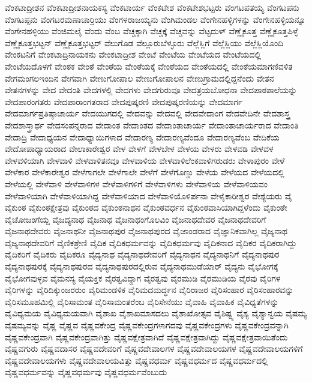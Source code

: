 {ವೆಂಕಟಾದ್ರೀಶನ
ವೆಂಕಟಾದ್ರೀಶನಾಯಕಸ್ಯ
ವೆಂಕಟಾರ್ಯ
ವೆಂಕಟೇಶ
ವೆಂಕಟೇಶಭಟ್ಟರು
ವೆಂಗಟಪತಯ್ಯ
ವೆಂಗಟಪನು
ವೆಂಗಟಪ್ಪನು
ವೆಂಗಟರಮಣಾಚಾರ್ರಿಯು
ವೆಂಗಳರಾಜಯ್ಯನು
ವೆಂಗಿಮಂಡಲ
ವೆಂಗೇನಹಳ್ಳಿಗಳನ್ನು
ವೆಂಗೇನಹಳ್ಳಿಯನ್ನೂ
ವೆಂಗೇನಹಳ್ಳಿಯು
ವೆಂಜಿಮಲೈ
ವೆಂದು
ವೆಂಬ
ವೆಚ್ಚಕ್ಕಾಗಿ
ವೆಚ್ಚಕ್ಕೆ
ವೆಚ್ಚವನ್ನು
ವೆಟ್ಟದುಳ್
ವೆಣ್ಣೈಕೂತ್ತ
ವೆಣ್ಣೈಕೂತ್ತಪಿಳ್ಳೆ
ವೆಣ್ಣೈಕೂತ್ತಭಟ್ಟನ್
ವೆಣ್ಣೈಕೂತ್ತಭಟ್ಟರ್
ವೆಲುಗೊಡ
ವೆಲ್ಲೂರುಬೆಳ್ಳೂರು
ವೆಲ್ಲೆಸ್ಲಿಗೆ
ವೆಲ್ಲೆಸ್ಲಿಯು
ವೆಲ್ಲೆಸ್ಲಿಯೊಂದಿ
ವೇಂಕಟನಿಗೆ
ವೇಂಕಟಾದ್ರಿನಾಯಕನು
ವೇಂಕಟಾದ್ರೀಶ
ವೇಂಟೆ
ವೇಂಟೆಯ
ವೇಂಟೆಯದ
ವೇಂಟೆಯದಲ್ಲಿ
ವೇಂಟೆಯದೊಳಗೆ
ವೇಂಠಕ
ವೇಂಠೆ
ವೇಂಠೆಯ
ವೇಂಠೆಯಕ್ಕೆ
ವೇಂಠೆಯದ
ವೇಂಠೆಯದಲ್ಲಿ
ವೇಂಠೆಯಮಾಗಣಿವಳಿತ
ವೇಗಮಂಗಲಇಂದಿನ
ವೇಗವಾಗಿ
ವೇಣುಗೋಪಾಲ
ವೇಣುಗೋಪಾಲನ
ವೇಣುಗ್ರಾಮದಲ್ಲಿದ್ದನೆಂದು
ವೇತನ
ವೇತನಗಳನ್ನು
ವೇದ
ವೇದಂತಿ
ವೇದಗಳಲ್ಲಿ
ವೇದಗಳು
ವೇದಗುರುವೂ
ವೇದತ್ರಯಬೋಧನಾ
ವೇದಪಾಠಶಾಲೆಯನ್ನು
ವೇದಪಾರಂಗತರು
ವೇದಪಾರಾಂಗತರಾದ
ವೇದಪುಷ್ಕರಣಿ
ವೇದಪುಷ್ಕರಣಿಯನ್ನು
ವೇದಮಾರ್ಗ
ವೇದಮಾರ್ಗಪ್ರತಿಷ್ಠಾಚಾರ್ಯ
ವೇದಯುಗದಲ್ಲಿ
ವೇದವನ್ನು
ವೇದವಲ್ಲಿ
ವೇದವೇದಾಂಗ
ವೇದವೇದಿನೇ
ವೇದಶಾಸ್ತ್ರ
ವೇದಶಾಸ್ತ್ರಾರ್ಥ
ವೇದಸಂಪನ್ನರಾದ
ವೇದಾಂತ
ವೇದಾಂತದ
ವೇದಾಂತಾಚಾರ್ಯ
ವೇದಾಂತಾಚಾರ್ಯರಾದ
ವೇದಾಂತಿ
ವೇದಾದ್ರಿ
ವೇದಾಧ್ಯಯನ
ವೇದಾಧ್ಯಾಯಿಗಳಾದ
ವೇದಾರಣ್ಯ
ವೇದಾರಣ್ಯವೆಂದೂ
ವೇದಾರಣ್ಯವೆಂಬ
ವೇದಿಕೆಯ
ವೇದೋಪಾಧ್ಯಾಯರಾದ
ವೇಲಾಕಾರೇಶ್ವರ
ವೇಳ
ವೇಳಗೆ
ವೇಳಬೇಳ
ವೇಳಯ
ವೇಳರು
ವೇಳವಡಿ
ವೇಳವಳ
ವೇಳವಳಿಯಾಗಿ
ವೇಳವಾಳಿ
ವೇಳವಾಳಿತನವೂ
ವೇಳವಾಳಿಯ
ವೇಳವಾಳಿಲೆಂಕವಾಳಿಗರುಡರು
ವೇಳಾಪುರಂ
ವೇಳೆ
ವೇಳೆಕಾರ
ವೇಳೆಕಾರೇಶ್ವರ
ವೇಳೆಗಾಗಲೇ
ವೇಳೆಗಾಲೇ
ವೇಳೆಗೆ
ವೇಳೆಗೊಣ್ಡು
ವೇಳೆಯ
ವೇಳೆಯದ
ವೇಳೆಯದಲ್ಲಿ
ವೇಳೆಯಲ್ಲಿ
ವೇಳೆವಾಳಿ
ವೇಳೆವಾಳಿಗಳ
ವೇಳೆವಾಳಿಗಳಿಗೆ
ವೇಳೆವಾಳಿಗಳು
ವೇಳೆವಾಳಿಯ
ವೇಳೆವಾಳಿಯವಂ
ವೇಳೆವಾಳಿಯಾಗಿ
ವೇಳೆವಾಳಿಯಾಗಿದ್ದ
ವೇಳೆವಾಳಿಯಾದ
ವೇಳೆವಾಳಿಯೊಳಿರ್ಪನಾ
ವೇಳೈಕಾರೀಶ್ವರ
ವೇಶ್ಯೆಯರು
ವೈ
ವೈಕುಂಠ
ವೈಕುಂಠಕ್ಷೇತ್ರವು
ವೈಕುಂಠದ
ವೈಕುಂಠನಾಥನ
ವೈಕುಂಠವರ್ಧನ
ವೈಕುಂಠವಾಸಿಯಾಗಿದ್ದಳೆಂದು
ವೈಕುಂಠೇ
ವೈಚೋಜಂಗೆಯ್ದ
ವೈಜದ್ಯನಾಥ
ವೈಜನಾಥ
ವೈಜನಾಥಂಗೊಲವಿಂ
ವೈಜನಾಥದೇವರ
ವೈಜನಾಥದೇವರಿಗೆ
ವೈಜನಾಥದೇವರು
ವೈಜನಾಥನೀ
ವೈಜನಾಥಪುರ
ವೈಜನಾಥಪುರದ
ವೈಜಾಂಡರಾದ
ವೈಜ್ಞಾನಿಕವಾಗಿಲ್ಲ
ವೈಜ್ಯನಾಥ
ವೈಜ್ಯನಾಥದೇವರಿಗೆ
ವೈಣಿಕಶ್ರೇಣಿ
ವೈದಿಕ
ವೈದಿಕಧರ್ಮವನ್ನು
ವೈದಿಕಧರ್ಮವು
ವೈದಿಕನಾದ
ವೈದಿಕರ
ವೈದಿಕರಾಗಿದ್ದು
ವೈದಿಕರಿಗೆ
ವೈದಿಕರು
ವೈದಿಕರೂ
ವೈದ್ಯನಾಥ
ವೈದ್ಯನಾಥದೇವರಿಗೆ
ವೈದ್ಯನಾಥನ
ವೈದ್ಯನಾಥನಿಗೆ
ವೈದ್ಯನಾಥಪುರ
ವೈದ್ಯನಾಥಪುರಕ್ಕೆ
ವೈದ್ಯನಾಥಪುರದ
ವೈದ್ಯನಾಥಪುರದಲ್ಲಿರುವ
ವೈದ್ಯನಾಥಮುಡೆಯಾರ್
ವೈದ್ಯನು
ವೈಭೋಗಕ್ಕೆ
ವೈಭೋಗವುಳ್ಳವ
ವೈಮನಸ್ಯ
ವೈಯಕ್ತಿಕ
ವೈರತ್ವವಿದ್ದಾಗ
ವೈರತ್ವವು
ವೈರಮುಡಿ
ವೈರಮುಡಿಯ
ವೈರವು
ವೈರಿಗಳ
ವೈರಿಗಳನ್ನು
ವೈರಿದಿಕ್ಕುಂಜರರುಂ
ವೈರಿಮಂಡಳಿಕ
ವೈರಿಮದಮರ್ದ್ಧನ
ವೈರಿರಾಜರ
ವೈರಿಸಂಹಾರ
ವೈರಿಸಂಹಾರವನ್ನು
ವೈರಿಸಮೂಹಮಿಲ್ಲಿ
ವೈರಿಸಾಮಂತ
ವೈರಿಸಾಮಂತರೆಂಬ
ವೈರಿಸೇನೆಯು
ವೈವಾಹಿ
ವೈವಾಹಿಕ
ವೈವಿಧ್ಯತೆಗಳನ್ನು
ವೈವಿಧ್ಯಮಯ
ವೈವಿಧ್ಯಮಯವಾಗಿ
ವೈಶಾಖ
ವೈಶಾಖಮಾಸದಲು
ವೈಶಾಖೋತ್ಸವ
ವೈಶಿಷ್ಟ್ಯ
ವೈಶ್ಯ
ವೈಶ್ಯಾನ್ವಯ
ವೈಷಮ್ಯ
ವೈಷಮ್ಯವನ್ನು
ವೈಷ್ಣ
ವೈಷ್ಣವ
ವೈಷ್ಣವಕೇಂದ್ರ
ವೈಷ್ಣವಕೇಂದ್ರಗಳಾಗದವು
ವೈಷ್ಣವಕೇಂದ್ರಗಳು
ವೈಷ್ಣವಕೇಂದ್ರವನ್ನಾಗಿ
ವೈಷ್ಣವಕೇಂದ್ರವಾಗಿ
ವೈಷ್ಣವಕೇಂದ್ರವಾಗಿತ್ತು
ವೈಷ್ಣವಕ್ಷೇತ್ರವಾಗಿದೆ
ವೈಷ್ಣವಕ್ಷೇತ್ರವಾಗಿದ್ದು
ವೈಷ್ಣವಕ್ಷೇತ್ರವಾಯಿತೆಂದು
ವೈಷ್ಣವಗುರು
ವೈಷ್ಣವದಾಸರ
ವೈಷ್ಣವದೇವರಿಗೆ
ವೈಷ್ಣವದೇವಾಲಗಳ
ವೈಷ್ಣವದೇವಾಲಯಗಳ
ವೈಷ್ಣವದೇವಾಲಯಗಳಿಗೆ
ವೈಷ್ಣವದೇವಾಲಯಗಳು
ವೈಷ್ಣವದೇವಾಲಯವಿತ್ತು
ವೈಷ್ಣವಧರ್ಮ
ವೈಷ್ಣವಧರ್ಮದ
ವೈಷ್ಣವಧರ್ಮದಲ್ಲಿ
ವೈಷ್ಣವಧರ್ಮವನ್ನು
ವೈಷ್ಣವಧರ್ಮವು
ವೈಷ್ಣವಧರ್ಮವೆಂಬುದು
}
